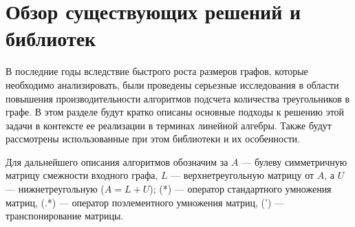 \documentclass[14pt]{matmex-diploma}
\begin{document}
\section {Обзор существующих решений и библиотек}
В последние годы вследствие быстрого роста размеров графов, которые необходимо анализировать, были проведены серьезные исследования в области повышения производительности алгоритмов подсчета количества треугольников в графе. В этом разделе будут кратко описаны основные подходы к решению этой задачи в контексте ее реализации в терминах линейной алгебры. Также будут рассмотрены использованные при этом библиотеки и их особенности.

Для дальнейшего описания алгоритмов обозначим за $A$ --- булеву симметричную матрицу смежности входного графа, $L$ --- верхнетреугольную матрицу от $A$, а $U$ --- нижнетреугольную ($A = L + U$); (*) --- оператор стандартного умножения матриц, (.*) --- оператор поэлементного умножения матриц, (') --- транспонирование матрицы.
\end{document}
